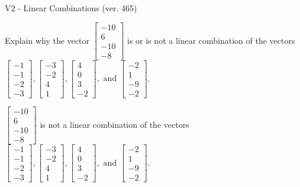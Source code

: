 \begin{exercise}
  \begin{exerciseTitle}V2 - Linear Combinations (ver. 465)\end{exerciseTitle}
  \begin{exerciseStatement}
    Explain why the vector \(\left[\begin{array}{c}
-10 \\
6 \\
-10 \\
-8
\end{array}\right]\)  is or is not a linear 
	combination of the vectors \(\left[\begin{array}{c}
-1 \\
-1 \\
-2 \\
-3
\end{array}\right] , \left[\begin{array}{c}
-3 \\
-2 \\
4 \\
1
\end{array}\right] , \left[\begin{array}{c}
4 \\
0 \\
3 \\
-2
\end{array}\right] , \text{ and } \left[\begin{array}{c}
-2 \\
1 \\
-9 \\
-2
\end{array}\right]\).
	


  \end{exerciseStatement}
  \begin{exerciseAnswer}
   \(\left[\begin{array}{c}
-10 \\
6 \\
-10 \\
-8
\end{array}\right]\) 
  	 is not  
	a linear combination of the vectors \(\left[\begin{array}{c}
-1 \\
-1 \\
-2 \\
-3
\end{array}\right] , \left[\begin{array}{c}
-3 \\
-2 \\
4 \\
1
\end{array}\right] , \left[\begin{array}{c}
4 \\
0 \\
3 \\
-2
\end{array}\right] , \text{ and } \left[\begin{array}{c}
-2 \\
1 \\
-9 \\
-2
\end{array}\right]\).


\end{exerciseAnswer}
\end{exercise}
